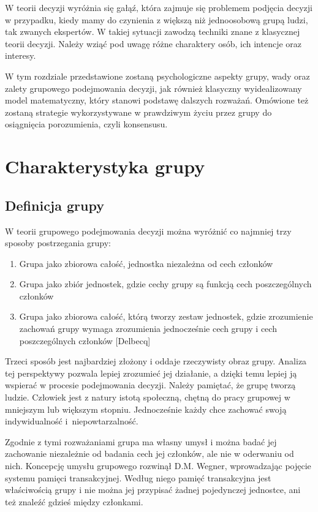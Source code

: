 W teorii decyzji wyróżnia się gałąź, która zajmuje się problemem podjęcia decyzji 
w przypadku, kiedy mamy do czynienia z większą niż jednoosobową grupą ludzi, tak 
zwanych ekspertów. W takiej sytuacji zawodzą techniki znane  z klasycznej 
teorii decyzji. Należy wziąć pod uwagę różne charaktery osób, ich intencje oraz
interesy.

W tym rozdziale przedstawione zostaną psychologiczne aspekty grupy, wady oraz 
zalety grupowego podejmowania decyzji, jak również klasyczny wyidealizowany 
model matematyczny, który stanowi podstawę dalszych rozważań. Omówione też 
zostaną strategie wykorzystywane w prawdziwym życiu przez grupy do osiągnięcia 
porozumienia, czyli konsensusu.

\section{Charakterystyka grupy}

\subsection{Definicja grupy}
W teorii grupowego podejmowania decyzji można wyróżnić co najmniej trzy sposoby 
postrzegania grupy:
\begin{enumerate}[1)]

\item Grupa jako zbiorowa całość, jednostka niezależna od cech członków

\item Grupa jako zbiór jednostek, gdzie cechy grupy są funkcją cech poszczególnych członków

\item Grupa jako zbiorowa całość, którą tworzy zestaw jednostek, gdzie zrozumienie 
zachowań grupy wymaga zrozumienia jednocześnie cech grupy i cech poszczególnych
członków [Delbecq]

\end{enumerate}
Trzeci sposób jest najbardziej złożony i oddaje rzeczywisty obraz grupy. Analiza tej 
perspektywy pozwala lepiej zrozumieć jej działanie, a dzięki temu lepiej ją wspierać 
w procesie podejmowania decyzji. Należy pamiętać, że grupę tworzą ludzie. Człowiek jest 
z natury istotą społeczną, chętną do pracy grupowej w mniejszym lub większym stopniu. 
Jednocześnie każdy chce zachować swoją indywidualność i niepowtarzalność. 

Zgodnie z tymi rozważaniami grupa ma własny umysł i można badać jej zachowanie niezależnie 
od badania cech jej członków, ale nie w oderwaniu od nich. Koncepcję umysłu grupowego rozwinął 
D.M. Wegner, wprowadzając pojęcie systemu pamięci transakcyjnej. Według niego pamięć transakcyjna 
jest właściwością grupy i nie można jej przypisać  żadnej pojedynczej jednostce, ani też znaleźć 
gdzieś między członkami.


